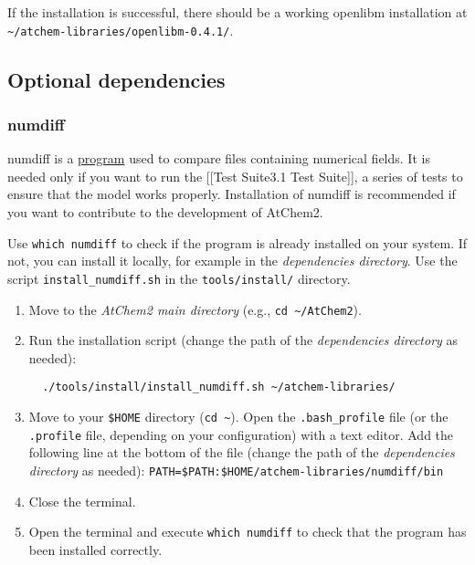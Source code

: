 If the installation is successful, there should be a working openlibm
installation at
\texttt{\textasciitilde{}/atchem-libraries/openlibm-0.4.1/}.

\subsection{Optional
  dependencies} \label{subsec:optional-dependencies}

\subsubsection{numdiff} \label{numdiff}

numdiff is a \href{https://www.nongnu.org/numdiff/}{program} used to
compare files containing numerical fields. It is needed only if you
want to run the {[}{[}Test Suite\textbar{}3.1 Test Suite{]}{]}, a
series of tests to ensure that the model works properly. Installation
of numdiff is recommended if you want to contribute to the development
of AtChem2.

Use \texttt{which\ numdiff} to check if the program is already
installed on your system. If not, you can install it locally, for
example in the \emph{dependencies directory}. Use the script
\texttt{install\_numdiff.sh} in the \texttt{tools/install/} directory.

\begin{enumerate}
\item Move to the \emph{AtChem2 main directory} (e.g., \texttt{cd\
    \textasciitilde{}/AtChem2}).
\item Run the installation script (change the path of the
  \emph{dependencies directory} as needed):
  \begin{verbatim}
  ./tools/install/install_numdiff.sh ~/atchem-libraries/
\end{verbatim}
\item Move to your \texttt{\$HOME} directory (\texttt{cd\
    \textasciitilde{}}). Open the \texttt{.bash\_profile} file (or the
  \texttt{.profile} file, depending on your configuration) with a text
  editor. Add the following line at the bottom of the file (change the
  path of the \emph{dependencies directory} as needed):
  \texttt{PATH=\$PATH:\$HOME/atchem-libraries/numdiff/bin}
\item Close the terminal.
\item Open the terminal and execute \texttt{which\ numdiff} to check
  that the program has been installed correctly.
\end{enumerate}

